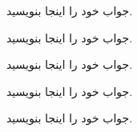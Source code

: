 \documentclass[12pt, answers]{exam}
\begin{document}
\begin{questions}

    

    \begin{solution}
        جواب خود را اینجا بنویسید.
    \end{solution}

    \pagebreak

    

    \begin{solution}
        جواب خود را اینجا بنویسید.
    \end{solution}

    \pagebreak

    

    \begin{solution}
        جواب خود را اینجا بنویسید.
    \end{solution}

    \pagebreak

    

    \begin{solution}
        جواب خود را اینجا بنویسید.
    \end{solution}

    \pagebreak

    

    \begin{solution}
        جواب خود را اینجا بنویسید.
    \end{solution}
\end{questions}
\end{document}
